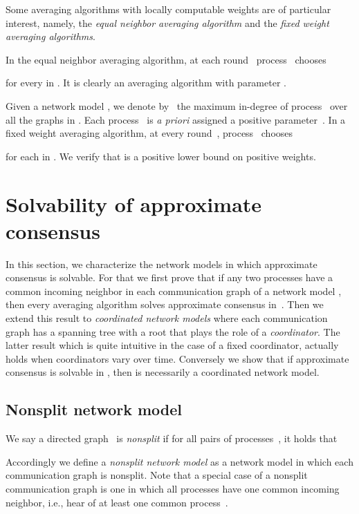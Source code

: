 \documentclass[a4paper]{article}
\theoremstyle{newthm}
\begin{document}
Some averaging algorithms with locally computable weights are of particular interest, namely,
	the {\em equal neighbor averaging algorithm\/} and the {\em fixed weight averaging algorithms}.
      
In the equal neighbor averaging algorithm, at each round~ process~ chooses 
	
	for every  in .
It is clearly an averaging algorithm  with parameter .

Given a network model , we denote by~ the  maximum
	in-degree of process~ over all the graphs in .
Each process~ is  {\em a priori\/} assigned a positive parameter~.
In a  fixed weight averaging algorithm, at  every round~, 
	process~ chooses  

	for each  in .
We verify that 
	 is a positive lower bound on  positive weights.


\section{Solvability of approximate consensus}

In this section, we characterize the network models in which approximate consensus is 
	solvable.
For that we first prove that if any two processes have a common incoming neighbor 
	in each communication graph of a network model , then every averaging algorithm 
	solves approximate consensus in~.
Then we extend this result to {\em coordinated network models} where each communication graph has a
	spanning tree with a root that plays the role of a {\em coordinator}. 
The latter result which is quite intuitive in the case of a fixed coordinator, actually holds when
	coordinators vary over time.
Conversely we show that  if approximate consensus is solvable in  ,
	then  is necessarily a coordinated network  model.
	
	 
\subsection{Nonsplit network model}

We say a directed graph~ is {\em nonsplit\/} if for all pairs of
     processes~, it holds that
     
Accordingly we define a {\em nonsplit network model\/} as a network model 
	in which each communication graph is nonsplit.
Note that a special case of a nonsplit communication graph is one in
     which all processes have one common incoming neighbor, i.e.,
     hear of at least one common process~.
\end{document}
